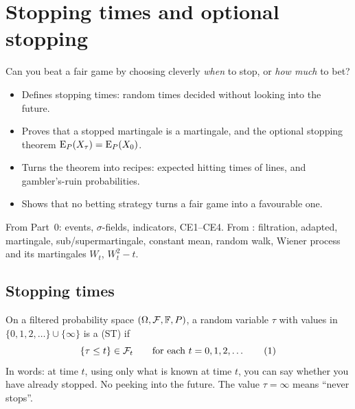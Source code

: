 \chapter{Stopping times and optional stopping}
\label{ch:stopping}

\begin{question}
Can you beat a fair game by choosing cleverly \emph{when} to stop, or \emph{how much} to bet?
\end{question}

\begin{whatfor}
\begin{itemize}
  \item Defines stopping times: random times decided without looking into the future.
  \item Proves that a stopped martingale is a martingale, and the optional stopping theorem $\operatorname{E}_P(X_\tau)=\operatorname{E}_P(X_0)$.
  \item Turns the theorem into recipes: expected hitting times of lines, and gambler's-ruin probabilities.
  \item Shows that no betting strategy turns a fair game into a favourable one.
\end{itemize}
\end{whatfor}

\begin{prereq}
From Part~0: events, $\sigma$-fields, indicators, CE1--CE4. From : filtration, adapted, martingale, sub/supermartingale, constant mean, random walk, Wiener process and its martingales $W_t$, $W_t^2-t$.
\end{prereq}

\section{Stopping times}

\begin{definition}
\label{def:st}
On a filtered probability space $(\Omega,\mathcal F,\mathbb F,P)$, a random variable $\tau$ with values in $\{0,1,2,\dots\}\cup\{\infty\}$ is a  (ST) if
\[
  \{\tau\le t\}\in\mathcal F_t\qquad\text{for each }t=0,1,2,\dots \tag{1}
\]
In words: at time $t$, using only what is known at time $t$, you can say whether you have already stopped. No peeking into the future. The value $\tau=\infty$ means ``never stops''.
\end{definition}

